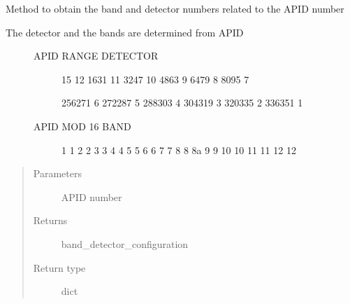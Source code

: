 \begin{fulllineitems}
\label{\detokenize{s2boa.ingestions:s2boa.ingestions.functions.get_band_detector}}
Method to obtain the band and detector numbers related to the APID number
\begin{description}
\item[{The detector and the bands are determined from APID}] \leavevmode\begin{description}
\item[{APID RANGE     DETECTOR}] \sphinxhyphen{}15           12
16\sphinxhyphen{}31           11
32\sphinxhyphen{}47           10
48\sphinxhyphen{}63           9
64\sphinxhyphen{}79           8
80\sphinxhyphen{}95           7

256\sphinxhyphen{}271           6
272\sphinxhyphen{}287           5
288\sphinxhyphen{}303           4
304\sphinxhyphen{}319           3
320\sphinxhyphen{}335           2
336\sphinxhyphen{}351           1

\item[{APID MOD 16     BAND}]            1
1           2
2           3
3           4
4           5
5           6
6           7
7           8
8           8a
9           9
10          10
11          11
12          12

\end{description}

\end{description}
\begin{quote}\begin{description}
\item[{Parameters}] \leavevmode
{} \textendash{} APID number

\item[{Returns}] \leavevmode
band\_detector\_configuration

\item[{Return type}] \leavevmode
dict

\end{description}\end{quote}

\end{fulllineitems}


